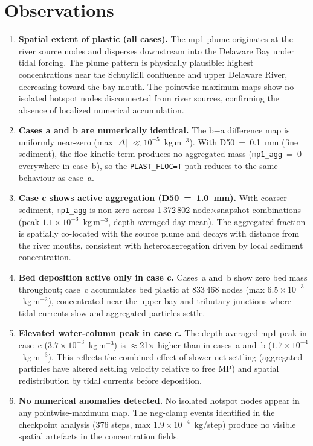 \documentclass[11pt]{article}
\begin{document}
\section*{Observations}

\begin{enumerate}[(1)]
  \item \textbf{Spatial extent of plastic (all cases).}
        The mp1 plume originates at the river source nodes and disperses
        downstream into the Delaware Bay under tidal forcing.  The plume
        pattern is physically plausible: highest concentrations near the
        Schuylkill confluence and upper Delaware River, decreasing toward
        the bay mouth.
        The pointwise-maximum maps show no isolated hotspot nodes
        disconnected from river sources, confirming the absence of
        localized numerical accumulation.

  \item \textbf{Cases a and b are numerically identical.}
        The b$-$a difference map is uniformly near-zero
        (max $|\Delta|$ $\ll 10^{-5}$~kg\,m$^{-3}$).  With
        D50~=~0.1~mm (fine sediment), the floc kinetic term produces
        no aggregated mass (\texttt{mp1\_agg}~=~0 everywhere in case~b),
        so the \texttt{PLAST\_FLOC=T} path reduces to the same
        behaviour as case~a.

  \item \textbf{Case c shows active aggregation (D50~=~1.0~mm).}
        With coarser sediment, \texttt{mp1\_agg} is non-zero across
        1\,372\,802 node$\times$snapshot combinations
        (peak $1.1\times10^{-3}$~kg\,m$^{-3}$, depth-averaged day-mean).
        The aggregated fraction is spatially co-located with the source
        plume and decays with distance from the river mouths, consistent
        with heteroaggregation driven by local sediment concentration.

  \item \textbf{Bed deposition active only in case c.}
        Cases~a and~b show zero bed mass throughout; case~c accumulates
        bed plastic at 833\,468 nodes (max
        $6.5\times10^{-3}$~kg\,m$^{-2}$), concentrated near the
        upper-bay and tributary junctions where tidal currents slow and
        aggregated particles settle.

  \item \textbf{Elevated water-column peak in case c.}
        The depth-averaged mp1 peak in case~c
        ($3.7\times10^{-3}$~kg\,m$^{-3}$) is $\approx$21$\times$
        higher than in cases~a and~b ($1.7\times10^{-4}$~kg\,m$^{-3}$).
        This reflects the combined effect of slower net settling
        (aggregated particles have altered settling velocity relative to
        free MP) and spatial redistribution by tidal currents before
        deposition.

  \item \textbf{No numerical anomalies detected.}
        No isolated hotspot nodes appear in any pointwise-maximum map.
        The neg-clamp events identified in the checkpoint analysis
        (376 steps, max $1.9\times10^{-4}$~kg/step) produce no
        visible spatial artefacts in the concentration fields.
\end{enumerate}
\end{document}
